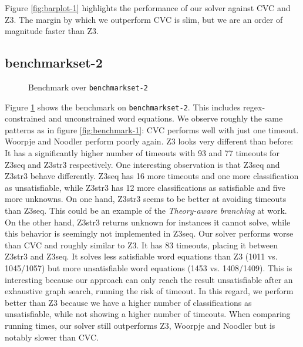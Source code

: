 \newpage

Figure \ref{fig:barplot-1} highlights the performance of our solver against CVC and Z3. The margin by which we outperform CVC is slim, but we are an order of magnitude faster than Z3.

\subsection{benchmarkset-2}

\begin{figure}%
\caption{Benchmark over \texttt{benchmarkset-2}}
\label{fig:benchmark-2}
\end{figure}

Figure \ref{fig:benchmark-2} shows the benchmark on \texttt{benchmarkset-2}. This includes regex-constrained and unconstrained word equations.
We observe roughly the same patterns as in figure \ref{fig:benchmark-1}: CVC performs well with just one timeout. Woorpje and Noodler perform poorly again.
Z3 looks very different than before: It has a significantly higher number of timeouts with 93 and 77 timeouts for Z3seq and Z3str3 respectively. One interesting observation is that Z3seq and Z3str3 behave differently. Z3seq has 16 more timeouts and one more classification as unsatisfiable, while Z3str3 has 12 more classifications as satisfiable and five more unknowns. On one hand, Z3str3 seems to be better at avoiding timeouts than Z3seq. This could be an example of the \textit{Theory-aware branching} at work. On the other hand, Z3str3 returns unknown for instances it cannot solve, while this behavior is seemingly not implemented in Z3seq.
Our solver performs worse than CVC and roughly similar to Z3. It has 83 timeouts, placing it between Z3str3 and Z3seq. It solves less satisfiable word equations than Z3 (1011 vs. 1045/1057) but more unsatisfiable word equations (1453 vs. 1408/1409). This is interesting because our approach can only reach the result unsatisfiable after an exhaustive graph search, running the risk of timeout. In this regard, we perform better than Z3 because we have a higher number of classifications as unsatisfiable, while not showing a higher number of timeouts.
When comparing running times, our solver still outperforms Z3, Woorpje and Noodler but is notably slower than CVC.


